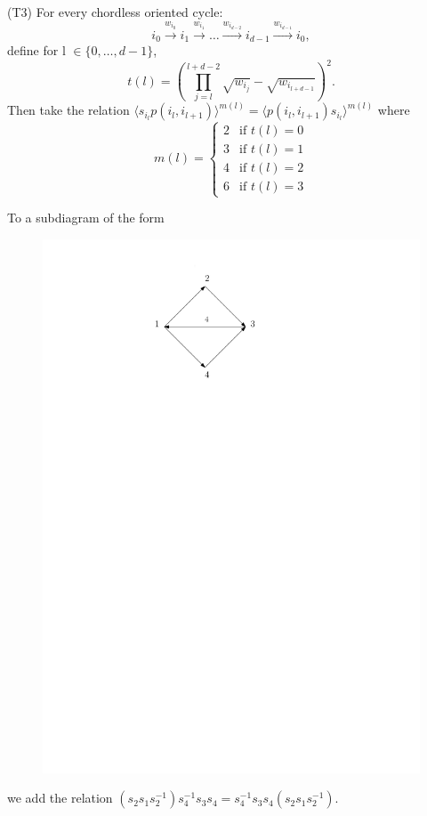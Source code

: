 \documentclass{beamer}
\begin{document}
\begin{frame}
(T3)  For every chordless oriented cycle:
$$i_{0} \stackrel{w_{i_{0}}}{\longrightarrow} i_{1} \stackrel{w_{i_{1}}}{\longrightarrow} \dots \stackrel{w_{i_{d-2}}}{\longrightarrow} i_{d-1} \stackrel{w_{i_{d-1}}}{\longrightarrow} i_{0},$$
define for l $\in \{0, \dots, d-1\}$, 
$$t(l) = (\prod_{j=l}^{l+d-2}{\sqrt{w_{i_{j}}}} - \sqrt{w_{i_{l+d-1}}})^{2}.$$
Then take the relation $\langle s_{i_{l}}p(i_{l}, i_{l+1}) \rangle^{m(l)} = \langle p(i_{l}, i_{l+1})s_{i_{l}} \rangle^{m(l)}$ where
$$m(l) =
\begin{cases}
2 &\text{if $t(l)=0$} \\
3 &\text{if $t(l)=1$} \\
4 &\text{if $t(l)=2$} \\
6 &\text{if $t(l)=3$}
\end{cases}$$
\end{frame}

\begin{frame}
To a subdiagram of the form
\begin{figure}
\includegraphics[scale = .50]{Diagram1.pdf}
\end{figure}
we add the relation $(s_{2}s_{1}s_{2}^{-1})s_{4}^{-1}s_{3}s_{4} = s_{4}^{-1}s_{3}s_{4}(s_{2}s_{1}s_{2}^{-1}).$
\end{frame}
\end{document}
